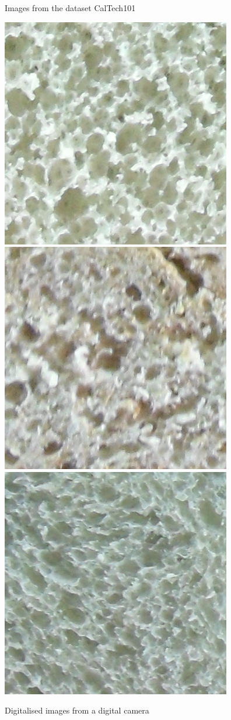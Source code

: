 \documentclass[oneside,a4paper,english,links]{amca}
\begin{document}
\begin{figure}[htb]
\caption{Images from the dataset CalTech101}
\label{fig:nonbread}
\end{figure}

\begin{figure}[htb]
\centering
\includegraphics[scale=0.3]{imagenes/camera/l19}
\includegraphics[scale=0.3]{imagenes/camera/s7}
\includegraphics[scale=0.3]{imagenes/camera/Sa14}
\caption{Digitalised images from a digital camera}
\label{fig:camera}
\end{figure}
\end{document}
